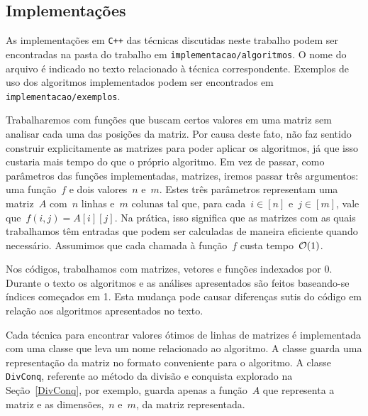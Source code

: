 \subsection{Implementações} \label{Intro:impl}
As implementações em \texttt{C++} das técnicas discutidas neste trabalho podem ser encontradas na pasta do trabalho em \texttt{implementacao/algoritmos}. O nome do arquivo é indicado no texto relacionado à técnica correspondente. Exemplos de uso dos algoritmos implementados podem ser encontrados em \texttt{implementacao/exemplos}.

Trabalharemos com funções que buscam certos valores em uma matriz sem analisar cada uma das posições da matriz. Por causa deste fato, não faz sentido construir explicitamente as matrizes para poder aplicar os algoritmos, já que isso custaria mais tempo do que o próprio algoritmo. Em vez de passar, como parâmetros das funções implementadas, matrizes, iremos passar três argumentos: uma função~$f$ e dois valores~$n$ e~$m$. Estes três parâmetros representam uma matriz~$A$ com~$n$ linhas e~$m$ colunas tal que, para cada~${ i \in [n] }$ e~${ j \in [m] }$, vale que~${ f(i,j) = A[i][j] }$. Na prática, isso significa que as matrizes com as quais trabalhamos têm entradas que podem ser calculadas de maneira eficiente quando necessário. Assumimos que cada chamada à função~$f$ custa tempo~$\mathcal{O}(1)$.

Nos códigos, trabalhamos com matrizes, vetores e funções indexados por 0. Durante o texto os algoritmos e as análises apresentados são feitos baseando-se índices começados em 1. Esta mudança pode causar diferenças sutis do código em relação aos algoritmos apresentados no texto.

Cada técnica para encontrar valores ótimos de linhas de matrizes é implementada com uma classe que leva um nome relacionado ao algoritmo. A classe guarda uma representação da matriz no formato conveniente para o algoritmo. A classe \texttt{DivConq}, referente ao método da divisão e conquista explorado na Seção~\ref{DivConq}, por exemplo, guarda apenas a função~$A$ que representa a matriz e as dimensões,~$n$ e~$m$, da matriz representada.
